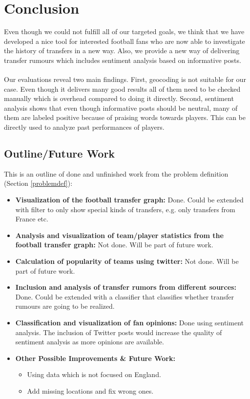 \documentclass{article}
\begin{document}
\section{Conclusion}
Even though we could not fulfill all of our targeted goals, we think that we have developed a nice tool for interested football fans who are now able to investigate the history of transfers in a new way. Also, we provide a new way of delivering transfer rumours which includes sentiment analysis based on informative posts. 
\\ \\
Our evaluations reveal two main findings. First, geocoding is not suitable for our case. Even though it delivers many good results all of them need to be checked manually which is overhead compared to doing it directly. Second, sentiment analysis shows that even though informative posts should be neutral, many of them are labeled positive because of praising words towards players. This can be directly used to analyze past performances of players.

\label{concl}
\subsection{Outline/Future Work}
This is an outline of done and unfinished work from the problem definition (Section \ref{problemdef}):

\begin{itemize}
\item \textbf{Visualization of the football transfer graph:} Done. Could be extended with filter to only show special kinds of transfers, e.g. only transfers from France etc.
\item \textbf{Analysis and visualization of team/player statistics from the football transfer graph:} Not done. Will be part of future work.
\item \textbf{Calculation of popularity of teams using twitter:} Not done. Will be part of future work.
\item \textbf{Inclusion and analysis of transfer rumors from different sources:} Done. Could be extended with a classifier that classifies whether transfer rumours are going to be realized.	
\item \textbf{Classification and visualization of fan opinions:} Done using sentiment analysis. The inclusion of Twitter posts would increase the quality of sentiment analysis as more opinions are available.
\item \textbf{Other Possible Improvements \& Future Work:}
\begin{itemize}
	\item Using data which is not focused on England.
	\item Add missing locations and fix wrong ones.
\end{itemize}
\end{itemize}


\end{document}
